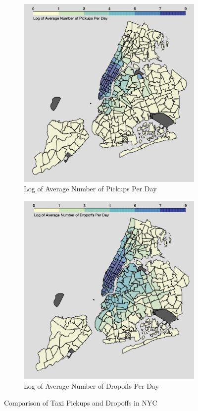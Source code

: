 \documentclass[11pt]{article}
\begin{document}
\begin{figure}[h!]
    \centering
    \begin{subfigure}[b]{0.45\textwidth}
        \includegraphics[width=\textwidth]{plots/LogAvgPU.png}
        \caption{Log of Average Number of Pickups Per Day}
        \label{fig:pickups}
    \end{subfigure}
    \hfill
    \begin{subfigure}[b]{0.45\textwidth}
        \includegraphics[width=\textwidth]{plots/LogAvgDO.png}
        \caption{Log of Average Number of Dropoffs Per Day}
        \label{fig:dropoffs}
    \end{subfigure}
    \caption{Comparison of Taxi Pickups and Dropoffs in NYC}
    \label{fig:comparison}
\end{figure}
\end{document}
